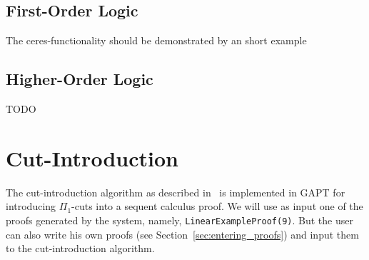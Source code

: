 \documentclass[a4paper,11pt]{article}
\newenvironment{meta}{\color{red}}{\color{black}} %
\begin{document}
\subsection{First-Order Logic}

\begin{meta}
The ceres-functionality should be demonstrated by an short example
\end{meta}

\subsection{Higher-Order Logic}

\begin{meta}
TODO
\end{meta}


\section{Cut-Introduction}

The cut-introduction algorithm as described in~\cite{Hetzl2012,Hetzl14Algorithmic,Hetzl14Introducing} is
implemented in GAPT for introducing $\Pi_1$-cuts into a sequent calculus
proof. We will use as input one of the proofs generated by
the system, namely, \texttt{LinearExampleProof(9)}. But the user can also
write his own proofs (see Section~\ref{sec:entering_proofs})
and input them to the cut-introduction algorithm.
\end{document}
